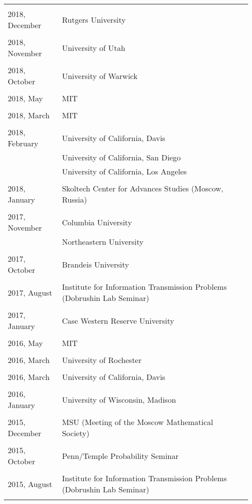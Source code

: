 \documentclass[letterpaper,11pt]{article}
\begin{document}
\begin{longtable}{llc}
	\\\\
	2018, December
	& Rutgers University
	\\\\
	2018, November
	& University of Utah
	\\\\
	2018, October
	& University of Warwick
	\\\\
	2018, May
	& MIT
	\\\\
	2018, March
	& MIT
	\\\\
	2018, February
	& University of California, Davis
	\\
	& University of California, San Diego
	\\
	& University of California, Los Angeles
	\\\\
	2018, January
	& Skoltech Center for Advances Studies (Moscow, Russia)
	\\\\
	2017, November
	& Columbia University
	\\
	& Northeastern University
	\\\\
	2017, October
	& Brandeis University
	\\\\
	2017, August
	& Institute for Information Transmission Problems
	(Dobrushin Lab Seminar)
	\\\\
	2017, January
	& Case Western Reserve University
	\\\\
	2016, May
	& MIT
	\\\\
	2016, March
	& University of Rochester
	\\\\
	2016, March
	& University of California, Davis
	\\\\
	2016, January
	& University of Wisconsin, Madison
	\\\\
	2015, December
	& MSU (Meeting of the Moscow Mathematical Society)
	\\\\
	2015, October
	& Penn/Temple Probability Seminar
	\\\\

	2015, August
	& Institute for Information Transmission Problems
	(Dobrushin Lab Seminar)
	\\\\


\end{longtable}
\end{document}
